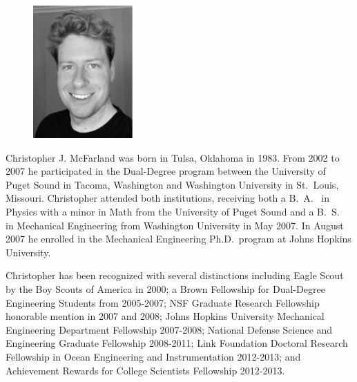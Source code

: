 \documentclass[12pt,twoside,final]{sty/thesis}
\begin{document}
\begin{vita}

 \dssp
 \begin{figure}
   \includegraphics[width=1.5in]{toph_bwCrop}
 \end{figure}

 Christopher J. McFarland was born in Tulsa, Oklahoma in 1983.  From
 2002 to 2007 he participated in the Dual-Degree program between the
 University of Puget Sound in Tacoma, Washington and Washington
 University in St.\ Louis, Missouri.  Christopher attended both
 institutions, receiving both a \mbox{B.\ A.\ } in Physics with a minor in Math
 from the University of Puget Sound and a \mbox{B.\ S.\ } in Mechanical
 Engineering from Washington University in May 2007.  In August 2007
 he enrolled in the Mechanical Engineering Ph.D.\ program at Johns
 Hopkins University.

 Christopher has been recognized with several distinctions including
 Eagle Scout by the Boy Scouts of America in 2000; a Brown Fellowship
 for Dual-Degree Engineering Students from 2005-2007; NSF Graduate
 Research Fellowship honorable mention in 2007 and 2008; Johns Hopkins
 University Mechanical Engineering Department Fellowship 2007-2008;
 National Defense Science and Engineering Graduate Fellowship
 2008-2011; Link Foundation Doctoral Research Fellowship in Ocean
 Engineering and Instrumentation 2012-2013; and Achievement Rewards
 for College Scientists Fellowship 2012-2013.

\end{vita}
\end{document}
